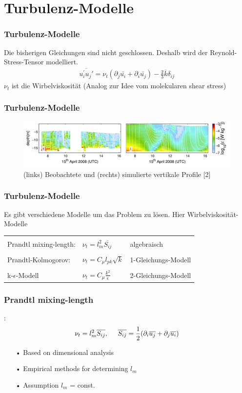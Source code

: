 \documentclass[11pt,t]{beamer}
\newcommand*\mean[1]{\overline{#1}}
\begin{document}
\section{Turbulenz-Modelle}
\begin{frame}
\frametitle{Turbulenz-Modelle}
Die bisherigen Gleichungen sind nicht geschlossen. Deshalb wird der Reynold-Stress-Tensor modelliert.
\begin{align*}
\overline{u_i^{'}u_j{'}} = \nu_t(\partial_j \bar{u_i} + \partial_i \bar{u_j})-\frac{2}{3}\mean{k}\delta_{ij}
\end{align*}
$\nu_t$ ist die Wirbelviskosität (Analog zur Idee vom molekularen shear stress) 
\end{frame}
\begin{frame}
\frametitle{Turbulenz-Modelle}
\begin{figure}
\includegraphics[width=0.8\linewidth]{images/turbulenz.png}
			\caption{(links) Beobachtete und (rechts) simulierte vertikale Profile [2] }
\end{figure}
\end{frame}
\begin{frame}
\frametitle{Turbulenz-Modelle}
Es gibt verschiedene Modelle um das Problem zu lösen. Hier Wirbelviskosität-Modelle\\
\begin{tabular}{l l l}
&\\
Prandtl mixing-length: & $\nu_t = l_m^2\overline{S_{ij}}$& algebraisch\\
&\\
Prandtl-Kolmogorov: &$\nu_t = C_\mu l_{pk}\sqrt{k}$& 1-Gleichungs-Modell\\
&\\
k-$\epsilon$-Modell & $\nu_t = C_\mu \frac{k^2}{\epsilon}$& 2-Gleichungs-Modell\\
\end{tabular}
\end{frame}
\begin{frame}
\frametitle{Prandtl mixing-length}:
\begin{equation}
\nu_t = l_m^2\overline{S_{ij}},\hspace{0.5cm}\overline{S_{ij}} = \frac{1}{2}(\partial_i \overline{u_j} + \partial_j \overline{u_i})
\end{equation}
\begin{itemize}
\item[•]Based on dimensional analysis
\item[•]Empirical methods for determining $l_m$
\item[•]Assumption $l_m$ = const.
\end{itemize}
\end{frame}
\end{document}

